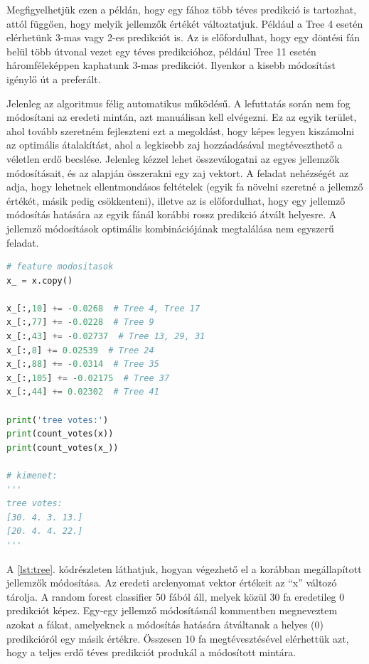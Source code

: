 Megfigyelhetjük ezen a példán, hogy egy fához több téves predikció is tartozhat, attól függően, hogy melyik jellemzők értékét változtatjuk. Például a Tree 4 esetén elérhetünk 3-mas vagy 2-es predikciót is. Az is előfordulhat, hogy egy döntési fán belül több útvonal vezet egy téves predikcióhoz, például Tree 11 esetén háromféleképpen kaphatunk 3-mas predikciót. Ilyenkor a kisebb módosítást igénylő út a preferált. 

Jelenleg az algoritmus félig automatikus működésű. A lefuttatás során nem fog módosítani az eredeti mintán, azt manuálisan kell elvégezni. Ez az egyik terület, ahol tovább szeretném fejleszteni ezt a megoldást, hogy képes legyen kiszámolni az optimális átalakítást, ahol a legkisebb zaj hozzáadásával megtéveszthető a véletlen erdő becslése. Jelenleg kézzel lehet összeválogatni az egyes jellemzők módosításait, és az alapján összerakni egy zaj vektort. A feladat nehézségét az adja, hogy lehetnek ellentmondásos feltételek (egyik fa növelni szeretné a jellemző értékét, másik pedig csökkenteni), illetve az is előfordulhat, hogy egy jellemző módosítás hatására az egyik fánál korábbi rossz predikció átvált helyesre. A jellemző módosítások optimális kombinációjának megtalálása nem egyszerű feladat.

\begin{lstlisting}[language=python, caption={Korábbi elemzés alapján manuálisan elvégzett jellemző módosítások.}, label=lst:tree]
# feature modositasok
x_ = x.copy()

x_[:,10] += -0.0268  # Tree 4, Tree 17
x_[:,77] += -0.0228  # Tree 9
x_[:,43] += -0.02737  # Tree 13, 29, 31
x_[:,8] += 0.02539  # Tree 24
x_[:,88] += -0.0314  # Tree 35
x_[:,105] += -0.02175  # Tree 37
x_[:,44] += 0.02302  # Tree 41

print('tree votes:')
print(count_votes(x))
print(count_votes(x_))

# kimenet:
'''
tree votes:
[30. 4. 3. 13.]
[20. 4. 4. 22.]
'''
\end{lstlisting}

A \ref{lst:tree}. kódrészleten láthatjuk, hogyan végezhető el a korábban megállapított jellemzők módosítása. Az eredeti arclenyomat vektor értékeit az ``x'' változó tárolja. A random forest classifier 50 fából áll, melyek közül 30 fa eredetileg 0 predikciót képez. Egy-egy jellemző módosításnál kommentben megneveztem azokat a fákat, amelyeknek a módosítás hatására átváltanak a helyes (0) predikcióról egy másik értékre. Összesen 10 fa megtévesztésével elérhettük azt, hogy a teljes erdő téves predikciót produkál a módosított mintára. 

